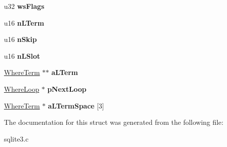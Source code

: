 \begin{DoxyCompactItemize}
\begin{tabbing}
\end{tabbing}\item 
u32 {\bfseries ws\+Flags}\hypertarget{structWhereLoop_a0cd1e9719a060631a647738bead23b8c}{}\label{structWhereLoop_a0cd1e9719a060631a647738bead23b8c}

\item 
u16 {\bfseries n\+L\+Term}\hypertarget{structWhereLoop_aaab088ed5c23647675e5afb10eb09338}{}\label{structWhereLoop_aaab088ed5c23647675e5afb10eb09338}

\item 
u16 {\bfseries n\+Skip}\hypertarget{structWhereLoop_aa6729780dfb942387abc2f1e0a6b94e7}{}\label{structWhereLoop_aa6729780dfb942387abc2f1e0a6b94e7}

\item 
u16 {\bfseries n\+L\+Slot}\hypertarget{structWhereLoop_a286a5e96fcc56cc835958ec2cbf6852f}{}\label{structWhereLoop_a286a5e96fcc56cc835958ec2cbf6852f}

\item 
\hyperlink{structWhereTerm}{Where\+Term} $\ast$$\ast$ {\bfseries a\+L\+Term}\hypertarget{structWhereLoop_ad8ea95e5ef2717fbbe1c1732d3ce1a9b}{}\label{structWhereLoop_ad8ea95e5ef2717fbbe1c1732d3ce1a9b}

\item 
\hyperlink{structWhereLoop}{Where\+Loop} $\ast$ {\bfseries p\+Next\+Loop}\hypertarget{structWhereLoop_a568852114be14c3a23cef6f8a1c98f4f}{}\label{structWhereLoop_a568852114be14c3a23cef6f8a1c98f4f}

\item 
\hyperlink{structWhereTerm}{Where\+Term} $\ast$ {\bfseries a\+L\+Term\+Space} \mbox{[}3\mbox{]}\hypertarget{structWhereLoop_a1e0a39de75d4288c791c29e2ebf8103a}{}\label{structWhereLoop_a1e0a39de75d4288c791c29e2ebf8103a}

\end{DoxyCompactItemize}


The documentation for this struct was generated from the following file\+:\begin{DoxyCompactItemize}
\item 
sqlite3.\+c\end{DoxyCompactItemize}
